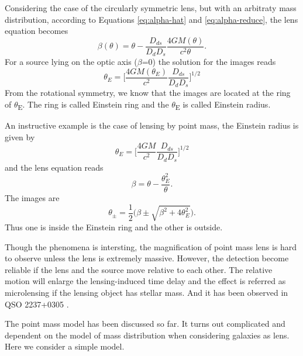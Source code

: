 \documentclass[letter,12pt]{article}
\begin{document}
Considering the case of the circularly symmetric lens, but with an
arbitraty mass distribution, according to Equations \eqref{eq:alpha-hat}
and \eqref{eq:alpha-reduce}, the lens equation becomes
\begin{equation}
\beta(\theta) = \theta - \frac{D_{ds}}{D_d D_s} \frac{4GM(\theta)}{c^2\theta} \label{eq:len-circular}.
\end{equation}
For a source lying on the optic axis (\(\beta\)=0) the solution for the images reads
   \begin{equation}
\theta_E = \bigg[ \frac{4GM(\theta_E)}{c^2} \frac{D_{ds}}{D_d D_s}\bigg]^{1/2}
   \end{equation}
From the rotational symmetry, we know that the images are located
at the ring of \(\theta\)\textsubscript{E}. The ring is called Einstein ring and the
\(\theta\)\textsubscript{E} is called Einstein radius.

An instructive example is the case of lensing by point mass, the Einstein radius is given by
   \begin{equation}
\theta_E = \bigg[ \frac{4GM}{c^2} \frac{D_{ds}}{D_d D_s}\bigg]^{1/2}
   \end{equation}
and the lens equation reads
   \begin{equation}
\beta = \theta - \frac{\theta_E^2}{\theta}.
   \end{equation}
The images are
\begin{equation}
\theta_{\pm} = \frac{1}{2} \bigg( \beta\pm\sqrt{\beta^2+4\theta_E^2} \bigg).
\end{equation}
Thus one is inside the Einstein ring and the other is outside.

Though the phenomena is intersting, the magnification of point
mass lens is hard to observe unless the lens is extremely
massive. However, the detection become reliable if the lens and the
source move relative to each other. The relative motion will enlarge
the lensing-induced time delay and the effect is referred as
microlensing if the lensing object has stellar mass. And it has been
observed in QSO 2237+0305 \citep{1990ApJ_358L_33W}.

\label{org6b0629e} The point mass model has been discussed so
far. It turns out complicated and dependent on the model of mass
distribution when considering galaxies as lens. Here we consider a
simple model.
\end{document}
